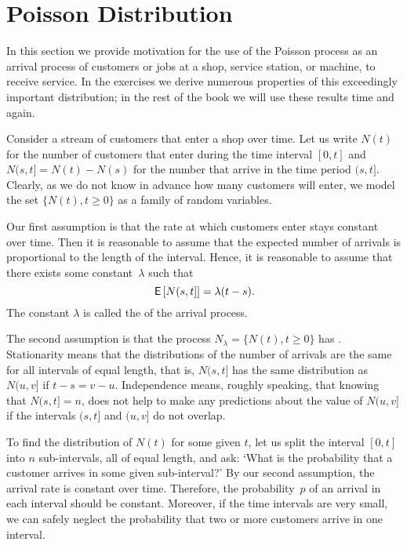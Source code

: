 \section{Poisson Distribution}
\label{sec:poisson-distribution}


In this section we provide motivation for the use of the Poisson process as an arrival process of customers or jobs at a shop, service station, or machine, to receive service.  In the exercises we derive numerous  properties of  this exceedingly important distribution; in the rest of the book we will use these results time and again.

Consider a stream of customers that enter a shop over time.
Let us write $N(t)$ for the number of customers that enter during the time interval $[0,t]$ and $N(s, t] = N(t)-N(s)$ for the number that arrive in the time period $(s, t]$.
Clearly, as we do not know in advance how many customers will enter, we model the set $\{N(t), t\geq 0\}$ as a family of  random variables.

Our first assumption is that the rate at which customers enter stays constant over time. Then it is reasonable to assume that
the expected number of arrivals is proportional to the  length of
the interval. Hence, it is reasonable to assume that there exists some
constant~$\lambda$ such that
\begin{equation}
  \label{eq:6}
 \,\mathsf{E}\left[N(s,t]\right] = \lambda (t-s).
\end{equation}
The constant $\lambda$ is called the  of the arrival process.


The second assumption is that the process $N_\lambda = \{N(t), t\geq 0\}$ has .
Stationarity means that the distributions of the number of arrivals are the same for all intervals of equal length, that is, 
$N(s,t]$ has the same distribution as $N(u, v]$ if $t-s = v-u$.
Independence means, roughly speaking, that knowing that $N(s,t]= n$, does not help to make any predictions about the value of $N(u, v]$ if the intervals $(s,t]$ and $(u, v]$ do not overlap.



To find the distribution of $N(t)$ for some given $t$, let us split the interval $[0,t]$ into $n$ sub-intervals, all of equal length, and ask: `What is the probability that a customer arrives in some given sub-interval?'
By our second assumption, the arrival rate is constant over time.
Therefore, the probability~$p$ of an arrival in each interval should be constant.
Moreover, if the time intervals are very small, we can safely neglect the probability that two or more customers arrive in one interval.

